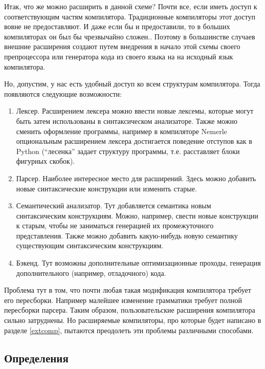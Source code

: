 \documentclass[a4paper,12pt,titlepage]{extarticle}
\begin{document}
Итак, что же можно расширить в данной схеме? Почти все, если иметь доступ к
соответствующим частям компилятора. Традиционные компиляторы этот доступ вовне
не предоставляют. И даже если бы и предоставили, то в больших компиляторах он
был бы чрезвычайно сложен.. Поэтому в большинстве случаев внешние расширения
создают путем внедрения в начало этой схемы своего препроцессора или генератора
кода из своего языка на на исходный язык компилятора.

Но, допустим, у нас есть удобный доступ ко всем структурам компилятора. Тогда
появляются следующие возможности:

\begin{enumerate}
  \item Лексер. Расширением лексера можно ввести новые лексемы, которые могут
  быть затем использованы в синтаксическом анализаторе. Также можно сменить
  оформление программы, например в компиляторе Nemerle опциональным расширением
  лексера достигается поведение отступов как в Python (``лесенка'' задает
  структуру программы, т.е. расставляет блоки фигурных скобок).
  \item Парсер. Наиболее интересное место для расширений. Здесь можно добавить
  новые синтаксические конструкции или изменить старые.
  \item Семантический анализатор. Тут добавляется семантика новым
  синтаксическим конструкциям. Можно, например, свести новые конструкции к
  старым, чтобы не заниматься генерацией их промежуточного представления.
  Также можно добавить какую-нибудь новую семантику существующим
  синтаксическим конструкциям.
  \item Бэкенд. Тут возможны дополнительные оптимизационные проходы, генерация
  дополнительного (например, отладочного) кода.
\end{enumerate}
Проблема тут в том, что почти любая такая модификация компилятора требует его
пересборки. Например малейшее изменение грамматики требует полной пересборки
парсера. Таким образом, пользовательские расширения компилятора сильно
затруднены. Но расширяемые компиляторы, про которые будет написано в разделе
\ref{extcomp}, пытаются преодолеть эти проблемы различными способами.

\subsection{Определения}
\end{document}
